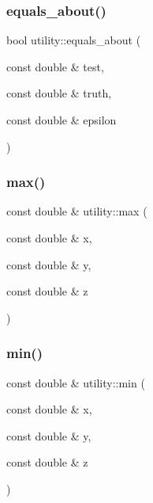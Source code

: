 \subsubsection{\texorpdfstring{equals\_about()}{equals\_about()}}
{\footnotesize\ttfamily bool utility\+::equals\+\_\+about (\begin{DoxyParamCaption}\item[{const double \&}]{test,  }\item[{const double \&}]{truth,  }\item[{const double \&}]{epsilon }\end{DoxyParamCaption})}

\mbox{\label{namespaceutility_adb70851ce3cf7edecde8490bd7f5c314}} 
\subsubsection{\texorpdfstring{max()}{max()}}
{\footnotesize\ttfamily const double \& utility\+::max (\begin{DoxyParamCaption}\item[{const double \&}]{x,  }\item[{const double \&}]{y,  }\item[{const double \&}]{z }\end{DoxyParamCaption})}

\mbox{\label{namespaceutility_a54a16aa114a439cc9b6bbf37853fbedb}} 
\subsubsection{\texorpdfstring{min()}{min()}}
{\footnotesize\ttfamily const double \& utility\+::min (\begin{DoxyParamCaption}\item[{const double \&}]{x,  }\item[{const double \&}]{y,  }\item[{const double \&}]{z }\end{DoxyParamCaption})}

\mbox{\label{namespaceutility_a6d97e65e822c1bbf339ed3b4125e8604}} 
